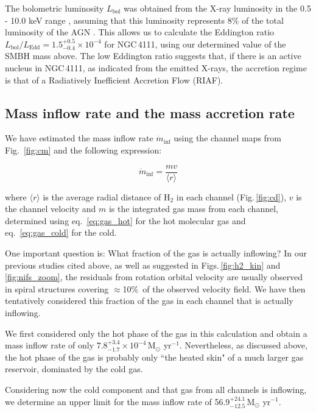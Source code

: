 \documentclass[fleqn,usenatbib]{mnras}
\begin{document}
The bolometric luminosity $L_\mathrm{bol}$ was obtained from the X-ray luminosity in the 0.5 - 10.0 keV range \citep{gonzalez-martin_x-ray_2009}, assuming that this luminosity represents 8\% of the total luminosity of the AGN \citep{nemmen_radiatively_2006}. This allows us to calculate the Eddington ratio $L_\mathrm{bol}/L_\mathrm{Edd} = 1.5^{+0.5}_{-0.4}\times10^{-4}$ for NGC\,4111, using our determined value of the SMBH mass above. The low Eddington ratio suggests that, if there is an active nucleus in NGC\,4111, as indicated from the emitted X-rays, the accretion regime is that of a Radiatively Inefficient Accretion Flow (RIAF).


\subsection{Mass inflow rate and the mass accretion rate}

We have estimated the mass inflow rate $\dot{m}_\mathrm{inf}$ using the channel maps from Fig.~\ref{fig:cm} and the following expression:

\begin{equation}
  \dot{m}_\mathrm{inf} = \frac{mv}{\langle r \rangle}  
\end{equation}

\noindent where $\langle r \rangle$ is the average radial distance of H$_2$ in each channel (Fig.\,\ref{fig:cd}), $v$ is the channel velocity and $m$ is the integrated gas mass from each channel, determined using eq.~\ref{eq:gas_hot} for the hot molecular gas and eq.~\ref{eq:gas_cold} for the cold.

One important question is: What fraction of the gas is actually inflowing? In our previous studies cited above, as well as suggested in Figs.\,\ref{fig:h2_kin} and \ref{fig:nifs_zoom}, the residuals from rotation orbital velocity are usually observed in spiral structures covering  $\approx$10\%\ of the observed velocity field. We have then tentatively considered this fraction of the gas in each channel that is actually inflowing.

We first considered only the hot phase of the gas in this calculation and obtain a mass inflow rate of only  $7.8^{+3.4}_{-1.7}\times 10^{-4}$\,M$_\odot$ yr$^{-1}$. 
Nevertheless, as discussed above, the hot phase of the gas is probably only ``the heated skin" of a much larger gas reservoir, dominated by the cold gas.

Considering now the cold component and that gas from all channels is inflowing, we determine an upper limit for the mass inflow rate of 56.9$^{+24.1}_{-12.5}$\,M$_\odot$ yr$^{-1}$.
\end{document}
